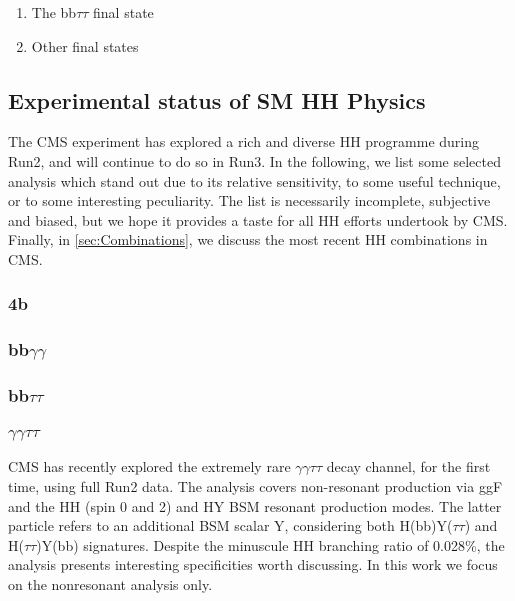 \documentclass[11pt]{article}
\begin{document}
\begin{enumerate}
\item The bb\(\tau \tau\) final state
\label{sec:org21b6cd0}

\item Other final states
\label{sec:orgfb3145b}
\end{enumerate}

\subsection{Experimental status of SM HH Physics}
\label{sec:org69e75ae}
The \ac{CMS} experiment has explored a rich and diverse HH programme during Run2, and will continue to do so in Run3.
In the following, we list some selected analysis which stand out due to its relative sensitivity, to some useful technique, or to some interesting peculiarity.
The list is necessarily incomplete, subjective and biased, but we hope it provides a taste for all HH efforts undertook by \ac{CMS}.
Finally, in \cref{sec:Combinations}, we discuss the most recent HH combinations in \ac{CMS}.

\subsubsection{4b}
\label{sec:org92dc813}
\label{sec:bbbb}
\subsubsection{bb\(\gamma \gamma\)}
\label{sec:orgecc8a9c}
\label{sec::bbgg}
\subsubsection{bb\(\tau \tau\)}
\label{sec:org7248e24}
\label{sec::bbtautau}
\subsubsection{\(\gamma \gamma \tau \tau\)}
\label{sec:orgf9fa9cd}
\ac{CMS} has recently explored the extremely rare \(\gamma \gamma \tau \tau\) decay channel, for the first time, using full Run2 data.
The analysis covers non-resonant production via \ac{ggF} and the HH (spin 0 and 2) and HY \ac{BSM} resonant production modes.
The latter particle refers to an additional BSM scalar Y, considering both H(bb)Y(\(\tau \tau\)) and H(\(\tau \tau\))Y(bb) signatures.
Despite the minuscule HH branching ratio of 0.028\%, the analysis presents interesting specificities worth discussing.
In this work we focus on the nonresonant analysis only.
\end{document}

